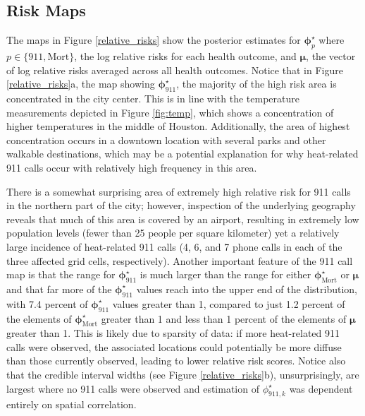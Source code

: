 \documentclass[final]{statsoc}
\begin{document}
\subsection{Risk Maps}
The maps in Figure \ref{relative_risks} show the posterior estimates for $\boldsymbol\phi^\star_{p}$ where $p\in \{911,\text{Mort}\}$, the log relative risks for each health outcome, and $\boldsymbol\mu$, the vector of log relative risks averaged across all health outcomes. Notice that in Figure \ref{relative_risks}a, the map showing $\boldsymbol\phi^\star_{911}$, the majority of the high risk area is concentrated in the city center. This is in line with the temperature measurements depicted in Figure \ref{fig:temp}, which shows a concentration of higher temperatures in the middle of Houston. Additionally, the area of highest concentration occurs in a downtown location with several parks and other walkable destinations, which may be a potential explanation for why heat-related 911 calls occur with relatively high frequency in this area. 

There is a somewhat surprising area of extremely high relative risk for 911 calls in the northern part of the city; however, inspection of the underlying geography reveals that much of this area is covered by an airport, resulting in extremely low population levels (fewer than 25 people per square kilometer) yet a relatively large incidence of heat-related 911 calls (4, 6, and 7 phone calls in each of the three affected grid cells, respectively). Another important feature of the 911 call map is that the range for $\boldsymbol\phi^\star_{911}$ is much larger than the range for either $\boldsymbol\phi^\star_{\text{Mort}}$ or $\boldsymbol\mu$ and that far more of the $\boldsymbol\phi^\star_{911}$ values reach into the upper end of the distribution, with 7.4 percent of $\boldsymbol\phi^\star_{911}$ values greater than 1, compared to just 1.2 percent of the elements of $\boldsymbol\phi^\star_{\text{Mort}}$ greater than 1 and less than 1 percent of the elements of $\boldsymbol\mu$ greater than 1. This is likely due to sparsity of data: if more heat-related 911 calls were observed, the associated locations could potentially be more diffuse than those currently observed, leading to lower relative risk scores. Notice also that the credible interval widths (see Figure \ref{relative_risks}b), unsurprisingly, are largest where no 911 calls were observed and estimation of $\phi^\star_{911,k}$ was dependent entirely on spatial correlation. 
\end{document}

